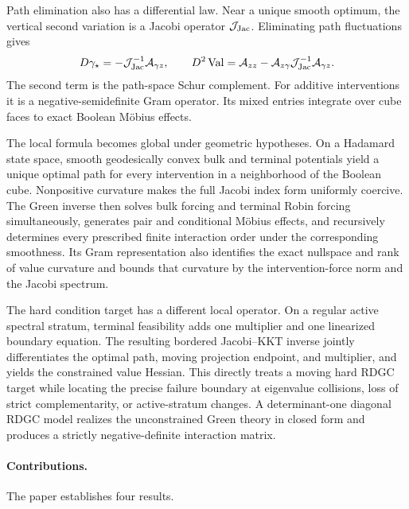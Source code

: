 Path elimination also has a differential law.  Near a unique smooth optimum,
the vertical second variation is a Jacobi operator \(\mathcal J_{\mathrm{Jac}}\).  Eliminating
path fluctuations gives
\[
  D\gamma_\star=-\mathcal J_{\mathrm{Jac}}^{-1}\mathcal A_{\gamma z},
  \qquad
  D^2\operatorname{Val}
  =
  \mathcal A_{zz}
  -\mathcal A_{z\gamma}\mathcal J_{\mathrm{Jac}}^{-1}\mathcal A_{\gamma z}.
\]
The second term is the path-space Schur complement.  For additive
interventions it is a negative-semidefinite Gram operator.  Its mixed entries
integrate over cube faces to exact Boolean M\"obius effects.

The local formula becomes global under geometric hypotheses.  On a Hadamard
state space, smooth geodesically convex bulk and terminal potentials yield a
unique optimal path for every intervention in a neighborhood of the Boolean
cube.  Nonpositive curvature makes the full Jacobi index form uniformly
coercive.  The Green inverse then solves bulk forcing and terminal Robin
forcing simultaneously, generates pair and conditional M\"obius effects, and
recursively determines every prescribed finite interaction order under the
corresponding smoothness.  Its Gram representation also
identifies the exact nullspace and rank of value curvature and bounds that
curvature by the intervention-force norm and the Jacobi spectrum.

The hard condition target has a different local operator.  On a regular
active spectral stratum, terminal feasibility adds one multiplier and one
linearized boundary equation.  The resulting bordered Jacobi--KKT inverse
jointly differentiates the optimal path, moving projection endpoint, and
multiplier, and yields the constrained value Hessian.  This directly treats a
moving hard RDGC target while locating the precise failure boundary at
eigenvalue collisions, loss of strict complementarity, or active-stratum
changes.  A determinant-one diagonal RDGC model realizes the unconstrained
Green theory in closed form and produces a strictly negative-definite
interaction matrix.

\paragraph{Contributions.}
The paper establishes four results.

